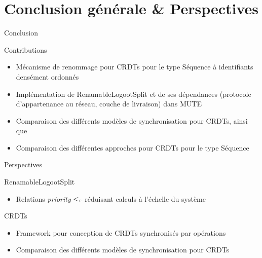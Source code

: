 \section{Conclusion générale \& Perspectives}

\begin{frame}{Conclusion}
  \begin{block}{Contributions}
    \begin{itemize}
      \item Mécanisme de renommage pour CRDTs pour le type Séquence à identifiants densément ordonnés
      \item Implémentation de RenamableLogootSplit et de ses dépendances (protocole d'appartenance au réseau, couche de livraison) dans MUTE
      \item Comparaison des différents modèles de synchronisation pour CRDTs, ainsi que
      \item Comparaison des différentes approches pour CRDTs pour le type Séquence
    \end{itemize}
  \end{block}
\end{frame}

\begin{frame}{Perspectives}
  \begin{block}{RenamableLogootSplit}
    \begin{itemize}
      \item Relations \emph{priority} $<_{\varepsilon}$ réduisant calculs à l'échelle du système
    \end{itemize}
  \end{block}
  \begin{block}{CRDTs}
    \begin{itemize}
      \item Framework pour conception de CRDTs synchronisés par opérations
      \item Comparaison des différents modèles de synchronisation pour CRDTs
    \end{itemize}
  \end{block}
\end{frame}

